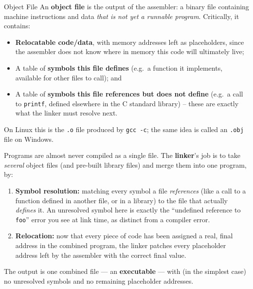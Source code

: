 \documentclass[full-course-notes.tex]{subfiles}
\begin{document}
\begin{defbox}{Object File}
An \textbf{object file} is the output of the assembler: a binary file containing machine
instructions and data \emph{that is not yet a runnable program}. Critically, it contains:
\begin{itemize}
  \item \textbf{Relocatable code/data}, with memory addresses left as placeholders, since the
  assembler does not know where in memory this code will ultimately live;
  \item A table of \textbf{symbols this file defines} (e.g.\ a function it implements, available
  for other files to call); and
  \item A table of \textbf{symbols this file references but does not define} (e.g.\ a call to
  \texttt{printf}, defined elsewhere in the C standard library) -- these are exactly what the
  linker must resolve next.
\end{itemize}
On Linux this is the \texttt{.o} file produced by \texttt{gcc -c}; the same idea is called an
\texttt{.obj} file on Windows.
\end{defbox}

\begin{coreidea}
Programs are almost never compiled as a single file. The \textbf{linker}'s job is to take
\emph{several} object files (and pre-built library files) and merge them into one program, by:
\begin{enumerate}
  \item \textbf{Symbol resolution:} matching every symbol a file \emph{references} (like a call
  to a function defined in another file, or in a library) to the file that actually
  \emph{defines} it. An unresolved symbol here is exactly the ``undefined reference to
  \texttt{foo}'' error you see at link time, as distinct from a compiler error.
  \item \textbf{Relocation:} now that every piece of code has been assigned a real, final
  address in the combined program, the linker patches every placeholder address left by the
  assembler with the correct final value.
\end{enumerate}
The output is one combined file --- an \textbf{executable} --- with (in the simplest case) no
unresolved symbols and no remaining placeholder addresses.
\end{coreidea}
\end{document}
